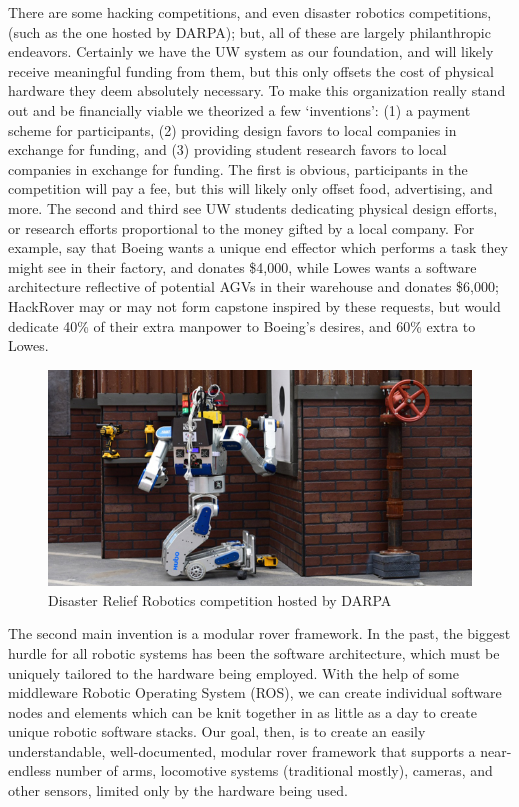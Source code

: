 \documentclass[a4paper, 10pt]{article}
\begin{document}
		There are some hacking competitions, and even disaster robotics competitions, (such as the one hosted by DARPA); but, all of these are largely philanthropic endeavors. Certainly we have the UW system as our foundation, and will likely receive meaningful funding from them, but this only offsets the cost of physical hardware they deem absolutely necessary. To make this organization really stand out and be financially viable we theorized a few `inventions': (1) a payment scheme for participants, (2) providing design favors to local companies in exchange for funding, and (3) providing student research favors to local companies in exchange for funding. The first is obvious, participants in the competition will pay a fee, but this will likely only offset food, advertising, and more. The second and third see UW students dedicating physical design efforts, or research efforts proportional to the money gifted by a local company. For example, say that Boeing wants a unique end effector which performs a task they might see in their factory, and donates \$4,000, while Lowes wants a software architecture reflective of potential AGVs in their warehouse and donates \$6,000; HackRover may or may not form capstone inspired by these requests, but would dedicate 40\% of their extra manpower to Boeing's desires, and 60\% extra to Lowes.
	
	 	\begin{figure} [!h]
			\centering
			\includegraphics[scale=2.25]{Photos/DARPA_competition}
			\caption{Disaster Relief Robotics competition hosted by DARPA}
			\label{DARPA_competition}
		\end{figure}

		The second main invention is a modular rover framework. In the past, the biggest hurdle for all robotic systems has been the software architecture, which must be uniquely tailored to the hardware being employed. With the help of some middleware Robotic Operating System (ROS), we can create individual software nodes and elements which can be knit together in as little as a day to create unique robotic software stacks. Our goal, then, is to create an easily understandable, well-documented, modular rover framework that supports a near-endless number of arms, locomotive systems (traditional mostly), cameras, and other sensors, limited only by the hardware being used.	
\end{document}
